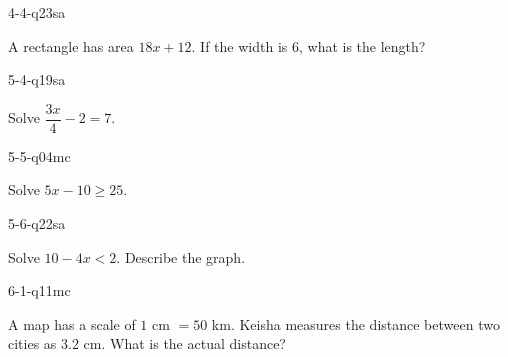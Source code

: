 \begin{practiceQuestion}{4-4-q23}{sa}
\begin{questionText}
A rectangle has area $18x + 12$. If the width is $6$, what is the length?
\end{questionText}
\end{practiceQuestion}

\begin{practiceQuestion}{5-4-q19}{sa}
\begin{questionText}
Solve $\dfrac{3x}{4} - 2 = 7$.
\end{questionText}
\end{practiceQuestion}

\begin{practiceQuestion}{5-5-q04}{mc}
\begin{questionText}
Solve $5x - 10 \geq 25$.
\end{questionText}
\end{practiceQuestion}

\begin{practiceQuestion}{5-6-q22}{sa}
\begin{questionText}
Solve $10 - 4x < 2$. Describe the graph.
\end{questionText}
\end{practiceQuestion}

\begin{practiceQuestion}{6-1-q11}{mc}
\begin{questionText}
A map has a scale of $1$ cm $= 50$ km. Keisha measures the distance between two cities as $3.2$ cm. What is the actual distance?
\end{questionText}
\end{practiceQuestion}


